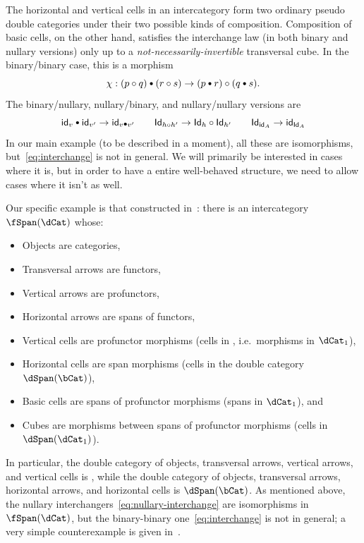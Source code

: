 \documentclass{amsart}
\newcommand{\bc}{\mathbin{\raisebox{1pt}{\scriptsize$\bullet$}}}
\let\oc\circ
\renewcommand{\id}{\mathsf{id}}
\newcommand{\Id}{\mathsf{Id}}
\begin{document}
The horizontal and vertical cells in an intercategory form two ordinary pseudo double categories under their two possible kinds of composition.
Composition of basic cells, on the other hand, satisfies the interchange law (in both binary and nullary versions) only up to a \emph{not-necessarily-invertible} transversal cube.
In the binary/binary case, this is a morphism
\begin{equation}
  \chi : (p\oc q) \bc (r\oc s) \to (p\bc r) \oc (q\bc s).\label{eq:interchange}
\end{equation}
The binary/nullary, nullary/binary, and nullary/nullary versions are
\begin{equation}
\id_v \bc \id_{v'} \to \id_{v\bc v'} \qquad
\Id_{h\oc h'} \to \Id_h \oc \Id_{h'} \qquad
\Id_{\id_A} \to \id_{\Id_A}\label{eq:nullary-interchange}
\end{equation}
In our main example (to be described in a moment), all these are isomorphisms, but~\eqref{eq:interchange} is not in general.
We will primarily be interested in cases where it is, but in order to have a entire well-behaved structure, we need to allow cases where it isn't as well.

Our specific example is that constructed in~\cite[\S6]{gp:intercategories-ii}: there is an intercategory $\fSpan(\dCat)$ whose:
\begin{itemize}
\item Objects are categories,
\item Transversal arrows are functors,
\item Vertical arrows are profunctors,
\item Horizontal arrows are spans of functors,
\item Vertical cells are profunctor morphisms (cells in \dCat, i.e.\ morphisms in $\dCat_1$),
\item Horizontal cells are span morphisms (cells in the double category $\dSpan(\bCat)$),
\item Basic cells are spans of profunctor morphisms (spans in $\dCat_1$), and
\item Cubes are morphisms between spans of profunctor morphisms (cells in $\dSpan(\dCat_1)$).
\end{itemize}
In particular, the double category of objects, transversal arrows, vertical arrows, and vertical cells is \dCat, while the double category of objects, transversal arrows, horizontal arrows, and horizontal cells is $\dSpan(\bCat)$.
As mentioned above, the nullary interchangers~\eqref{eq:nullary-interchange} are isomorphisms in $\fSpan(\dCat)$, but the binary-binary one~\eqref{eq:interchange} is not in general; a very simple counterexample is given in~\cite[6.5]{gp:intercategories-ii}.
\end{document}
